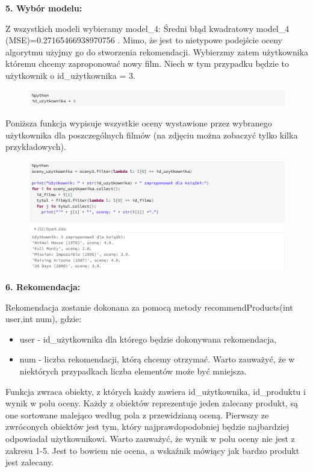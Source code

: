 \documentclass[12pt,a4paper]{report}
\begin{document}
\textbf{5. Wybór modelu:}

Z wszystkich modeli wybieramy model\_4:  Średni błąd kwadratowy model\_4 
\\(MSE)=0.27165466938970756 . Mimo, że jest to nietypowe podejście oceny algorytmu użyjmy go do stworzenia rekomendacji. Wybierzmy zatem użytkownika któremu chcemy zaproponować nowy film. Niech w tym przypadku będzie to użytkownik o id\_użytkownika = 3.

\begin{figure}[H]
\includegraphics[scale=0.5]{obrazy/ALS15.PNG} 
\end{figure}

Poniższa funkcja wypisuje wszystkie oceny wystawione przez wybranego użytkownika dla poszczególnych filmów (na zdjęciu można zobaczyć tylko kilka przykładowych).

\begin{figure}[H]
\includegraphics[scale=0.5]{obrazy/ALS16.PNG} 
\end{figure}

\textbf{6. Rekomendacja:}

Rekomendacja zostanie dokonana za pomocą metody recommendProducts(int user,int num), gdzie:
\begin{itemize}
\item user - id\_użytkownika dla którego będzie dokonywana rekomendacja,
\item num - liczba rekomendacji, którą chcemy otrzymać. Warto zauważyć, że w niektórych przypadkach liczba elementów może być mniejsza.
\end{itemize}

Funkcja zwraca obiekty, z których każdy zawiera id\_użytkownika, id\_produktu i wynik w polu oceny. Każdy z obiektów reprezentuje jeden zalecany produkt, są one sortowane malejąco według pola z przewidzianą oceną. Pierwszy ze zwróconych obiektów jest tym, który najprawdopodobniej będzie najbardziej odpowiadał użytkownikowi. Warto zauważyć, że wynik w polu oceny nie jest z zakresu 1-5. Jest to bowiem nie ocena, a wskaźnik mówiący jak bardzo produkt jest zalecany.
\end{document}

